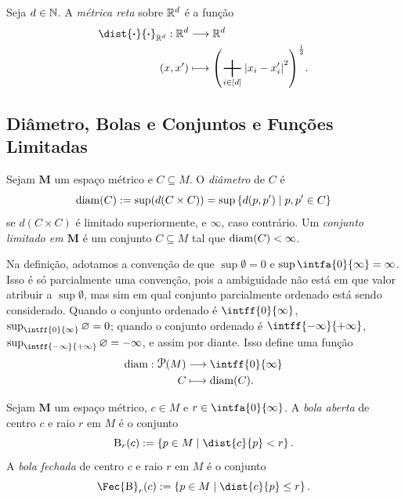 \begin{defi}
Seja $d \in \mathbb{N}$. A \emph{métrica reta} sobre $\mathbb{R}^d$ é a função
	\begin{align*}
	\func{\dist{\var}{\var}_{\R^d}}{\R^d}{\R^d}{(x,x')}{\left( \sum_{i \in [d]} \abs{x_i-x'_i}^2 \right)^{\frac{1}{2}}}.
	\end{align*}
\end{defi}


\subsection{Diâmetro, Bolas e Conjuntos e Funções Limitadas}

\begin{defi}
Sejam $\bm M$ um espaço métrico e $C \subseteq M$. O \emph{diâmetro} de $C$ é
	\begin{equation*}
	\operatorname{diam}(C) := \sup(d(C \times C)) = \sup\left\{d(p,p') \;\middle\vert\; p,p' \in C \right\}
	\end{equation*}
se $d(C \times C)$ é limitado superiormente, e $\infty$, caso contrário. Um \emph{conjunto limitado em $\bm M$} é um conjunto $C \subseteq M$ tal que $\operatorname{diam}(C) < \infty$.
\end{defi}

Na definição, adotamos a convenção de que $\sup \emptyset = 0$ e $\sup \intfa{0}{\infty} = \infty$. Isso é só parcialmente uma convenção, pois a ambiguidade não está em que valor atribuir a $\sup \emptyset$, mas sim em qual conjunto parcialmente ordenado está sendo considerado. Quando o conjunto ordenado é $\intff{0}{\infty}$, $\sup_{\intff{0}{\infty}} \emptyset = 0$; quando o conjunto ordenado é $\intff{-\infty}{+\infty}$, $\sup_{\intff{-\infty}{+\infty}} \emptyset = -\infty$, e assim por diante. Isso define uma função
	\begin{align*}
	\func{\diam}{\p(M)}{\intff{0}{\infty}}{C}{\diam(C)}.
	\end{align*}

\begin{defi}
Sejam $\bm M$ um espaço métrico, $c \in M$ e $r \in \intfa{0}{\infty}$. A \emph{bola aberta} de centro $c$ e raio $r$ em $M$ é o conjunto
	\begin{equation*}
	\bola_r(c) := \set{p \in M}{\dist{c}{p} < r}.
	\end{equation*}
A \emph{bola fechada} de centro $c$ e raio $r$ em $M$ é o conjunto
	\begin{equation*}
	\Fec{\bola}_r(c) := \set{p \in M}{\dist{c}{p} \leq r}.
	\end{equation*}
\end{defi}

